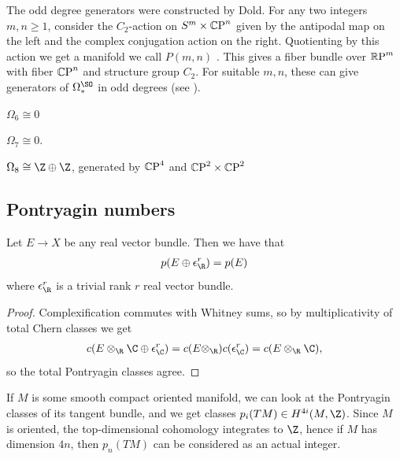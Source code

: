 \documentclass[11pt]{book}
\begin{document}
\begin{remark} The odd degree generators were constructed by Dold. For any two integers $m,n\ge1$, consider the $C_2$-action on $S^m \times {\mathbb{C}\text{P}}^n$ given by the antipodal map on the left and the complex conjugation action on the right. Quotienting by this action we get a manifold we call $P(m,n)$ \cite{doldErzeugendeThomschenAlgebra1956}. This gives a fiber bundle over ${\mathbb{R}\text{P}}^m$ with fiber ${\mathbb{C}\text{P}}^n$ and structure group $C_2$. For suitable $m,n$, these can give generators of $\Omega^\SO_\ast$ in odd degrees (see \cite[Satz~3]{doldErzeugendeThomschenAlgebra1956}).
\end{remark}

\begin{example} $\Omega_6\cong 0$
\end{example}

\begin{example}\label{exa:omega-so-7-is-zero} 
$\Omega_7\cong 0$.
\end{example}

\begin{example} $\Omega_8 \cong \Z \oplus \Z$, generated by ${\mathbb{C}\text{P}}^4$ and ${\mathbb{C}\text{P}}^2 \times {\mathbb{C}\text{P}}^2$
\end{example}

\subsection{Pontryagin numbers}

\begin{proposition}
\label{prop:pontryagin-classes-are-stable}
Let $E \to X$ be any real vector bundle. Then we have that
\begin{align*}
     p(E \oplus \epsilon_\R^r) = p(E)
\end{align*}
where $\epsilon_\R^r$ is a trivial rank $r$ real vector bundle.
\end{proposition}
\begin{proof} Complexification commutes with Whitney sums, so by multiplicativity of total Chern classes we get
\begin{align*}
    c(E \otimes_\R \C \oplus \epsilon_\C^r) = c(E \otimes_\R)c(\epsilon_\C^r) = c(E \otimes_\R \C),
\end{align*}
so the total Pontryagin classes agree.
\end{proof}

If $M$ is some smooth compact oriented manifold, we can look at the Pontryagin classes of its tangent bundle, and we get classes $p_i(TM) \in H^{4i}(M,\Z)$. Since $M$ is oriented, the top-dimensional cohomology integrates to $\Z$, hence if $M$ has dimension $4n$, then $p_n(TM)$ can be considered as an actual integer.
\end{document}
